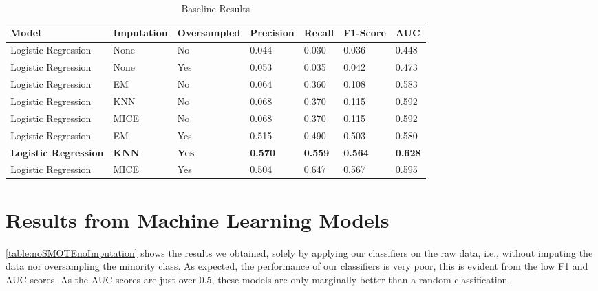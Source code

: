 \begin{table}[htp]
\small
\begin{center}
 \begin{tabular}{ | p{2cm} | p{1.5cm} | p{2cm} | p{1.5cm}| p{1.5cm} | p{1.5cm}| p{1.5cm} | }
 \hline
  Model & Imputation & Oversampled & Precision  & Recall & F1-Score & AUC

  \\ [0.5ex] 
 \hline\hline

    Logistic Regression & None & No& 0.044 & 0.030 & 0.036 & 0.448 \\ \hline
    Logistic Regression & None & Yes& 0.053 & 0.035 & 0.042 & 0.473 \\ \hline
    \midrule
    Logistic Regression & EM & No & 0.064 & 0.360 & 0.108 & 0.583 \\ \hline
    Logistic Regression & KNN & No & 0.068 & 0.370 & 0.115 & 0.592\\ \hline
    Logistic Regression & MICE & No & 0.068 & 0.370 & 0.115 & 0.592  \\ \hline
    \midrule
    Logistic Regression & EM & Yes & 0.515 & 0.490 & 0.503 & 0.580 \\ \hline
    \textbf{Logistic Regression} & \textbf{KNN} & \textbf{Yes} & \textbf{0.570} & \textbf{0.559} & \textbf{0.564} & \textbf{0.628}\\ \hline
    Logistic Regression & MICE & Yes & 0.504 & 0.647 & 0.567 & 0.595  \\ \hline

\end{tabular}
\end{center}

    \caption{Baseline Results}
\label{table:Baseresults}
\end{table}


\section{Results from Machine Learning Models}


\autoref{table:noSMOTEnoImputation} shows the results we obtained, solely by applying our classifiers on the raw data, i.e., without imputing the data nor oversampling the minority class. As expected, the performance of our classifiers is very poor, this is evident from the low F1 and AUC scores. As the AUC scores are just over 0.5, these models are only marginally better than a random classification.

